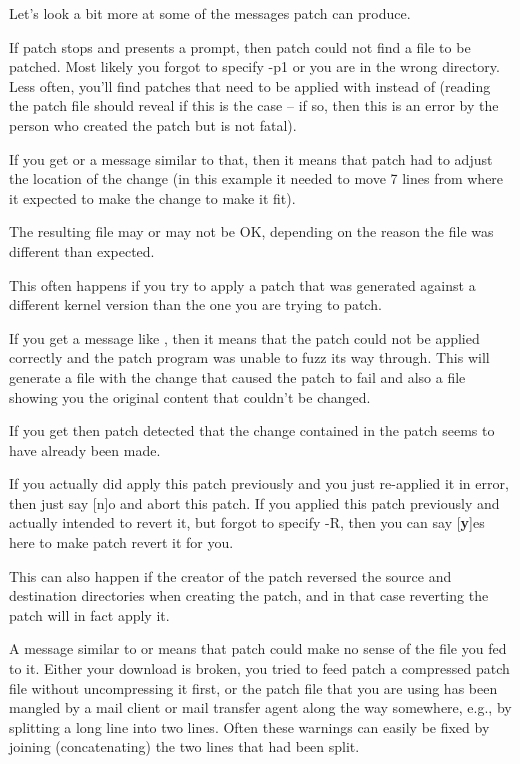 \documentclass[a4paper,8pt,english]{sphinxmanual}
\begin{document}
Let's look a bit more at some of the messages patch can produce.

If patch stops and presents a  prompt, then patch could not
find a file to be patched. Most likely you forgot to specify -p1 or you are
in the wrong directory. Less often, you'll find patches that need to be
applied with  instead of  (reading the patch file should reveal if
this is the case -- if so, then this is an error by the person who created
the patch but is not fatal).

If you get  or a
message similar to that, then it means that patch had to adjust the location
of the change (in this example it needed to move 7 lines from where it
expected to make the change to make it fit).

The resulting file may or may not be OK, depending on the reason the file
was different than expected.

This often happens if you try to apply a patch that was generated against a
different kernel version than the one you are trying to patch.

If you get a message like , then it means that the
patch could not be applied correctly and the patch program was unable to
fuzz its way through. This will generate a  file with the change that
caused the patch to fail and also a  file showing you the original
content that couldn't be changed.

If you get 
then patch detected that the change contained in the patch seems to have
already been made.

If you actually did apply this patch previously and you just re-applied it
in error, then just say {[}n{]}o and abort this patch. If you applied this patch
previously and actually intended to revert it, but forgot to specify -R,
then you can say {[}\textbf{y}{]}es here to make patch revert it for you.

This can also happen if the creator of the patch reversed the source and
destination directories when creating the patch, and in that case reverting
the patch will in fact apply it.

A message similar to  or
 means that patch could make no
sense of the file you fed to it. Either your download is broken, you tried to
feed patch a compressed patch file without uncompressing it first, or the patch
file that you are using has been mangled by a mail client or mail transfer
agent along the way somewhere, e.g., by splitting a long line into two lines.
Often these warnings can easily be fixed by joining (concatenating) the
two lines that had been split.
\end{document}
